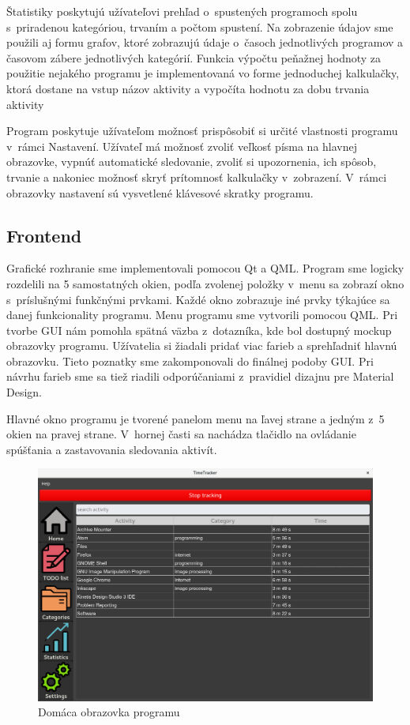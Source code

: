 \documentclass[]{article}
\begin{document}
Štatistiky poskytujú užívateľovi prehľad o~spustených programoch spolu s~priradenou kategóriou, trvaním a počtom spustení. Na zobrazenie údajov sme použili aj formu grafov, ktoré zobrazujú údaje o~časoch jednotlivých programov a časovom zábere jednotlivých kategórií. Funkcia výpočtu peňažnej hodnoty za použitie nejakého programu je implementovaná vo forme jednoduchej kalkulačky, ktorá dostane na vstup názov aktivity a vypočíta hodnotu za dobu trvania aktivity

Program poskytuje užívateľom možnosť prispôsobiť si určité vlastnosti programu v~rámci Nastavení. Užívateľ má možnosť zvoliť veľkosť písma na hlavnej obrazovke, vypnúť automatické sledovanie, zvoliť si upozornenia, ich spôsob, trvanie a nakoniec možnosť skryť prítomnosť kalkulačky v~zobrazení. V~rámci obrazovky nastavení sú vysvetlené klávesové skratky programu. 

\subsection{Frontend}
Grafické rozhranie sme implementovali pomocou Qt a QML. Program sme logicky rozdelili na 5 samostatných okien, podľa zvolenej položky v~menu sa zobrazí okno s~príslušnými funkčnými prvkami. Každé okno zobrazuje iné prvky týkajúce sa danej funkcionality programu. Menu programu sme vytvorili pomocou QML. Pri tvorbe GUI nám pomohla spätná väzba z~dotazníka, kde bol dostupný mockup obrazovky programu. Užívatelia si žiadali pridať viac farieb a sprehľadniť hlavnú obrazovku. Tieto poznatky sme zakomponovali do finálnej podoby GUI. Pri návrhu farieb sme sa tiež riadili odporúčaniami z~pravidiel dizajnu pre Material Design\cite{material_design_guidelines}.

\newpage

Hlavné okno programu je tvorené panelom menu na ľavej strane a jedným z~5 okien na pravej strane. V~hornej časti sa nachádza tlačidlo na ovládanie spúšťania a zastavovania sledovania aktivít.

\begin{figure}[h!]
	\includegraphics[width=\textwidth]{domaca_obrazovka}
	\caption{Domáca obrazovka programu}
\end{figure}
\end{document}
